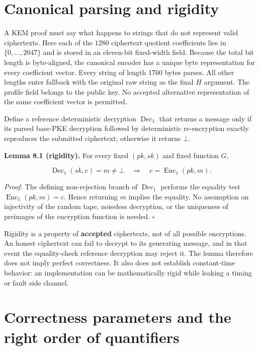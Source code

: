 \documentclass[
  11pt,
  a4paper,
  oneside]{report}
\begin{document}
\section{Canonical parsing and
rigidity}\label{canonical-parsing-and-rigidity}

A KEM proof must say what happens to strings that do not represent valid
ciphertexts. Here each of the \(1280\) ciphertext quotient coefficients
lies in \(\{0,\ldots,2047\}\) and is stored in an eleven-bit fixed-width
field. Because the total bit length is byte-aligned, the canonical
encoder has a unique byte representation for every coefficient vector.
Every string of length 1760 bytes parses. All other lengths enter
fallback with the original raw string as the final \(H\) argument. The
profile field belongs to the public key. No accepted alternative
representation of the same coefficient vector is permitted.

Define a reference deterministic decryption \(\operatorname{Dec}_1\)
that returns a message only if its parsed base-PKE decryption followed
by deterministic re-encryption exactly reproduces the submitted
ciphertext; otherwise it returns \(\bot\).

\textbf{Lemma 8.1 (rigidity).} For every fixed \((pk,sk)\) and fixed
function \(G\),

\[
\operatorname{Dec}_1(sk,c)=m\ne\bot
\quad\Longrightarrow\quad
c=\operatorname{Enc}_1(pk,m).
\]

\emph{Proof.} The defining non-rejection branch of
\(\operatorname{Dec}_1\) performs the equality test
\(\operatorname{Enc}_1(pk,m)=c\). Hence returning \(m\) implies the
equality. No assumption on injectivity of the random tape, noiseless
decryption, or the uniqueness of preimages of the encryption function is
needed. \(\square\)

Rigidity is a property of \textbf{accepted} ciphertexts, not of all
possible encryptions. An honest ciphertext can fail to decrypt to its
generating message, and in that event the equality-check reference
decryption may reject it. The lemma therefore does not imply perfect
correctness. It also does not establish constant-time behavior: an
implementation can be mathematically rigid while leaking a timing or
fault side channel.

\section{Correctness parameters and the right order of
quantifiers}\label{correctness-parameters-and-the-right-order-of-quantifiers}
\end{document}
